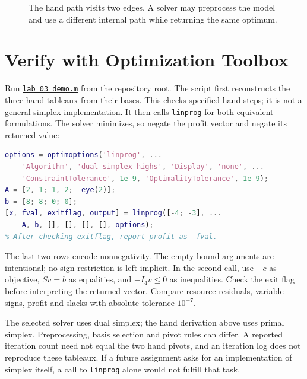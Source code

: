 \documentclass[11pt,a4paper]{article}
\begin{document}
\begin{figure}[H]
  \centering
  \caption{The hand path visits two edges. A solver may preprocess the model
    and use a different internal path while returning the same optimum.}
\end{figure}

\section{Verify with Optimization Toolbox}
Run \href{run:matlab/labs/lab_03_demo.m}{\texttt{lab\_03\_demo.m}} from the
repository root. The script first reconstructs the three hand tableaux from
their bases. This checks specified hand steps; it is not a general simplex
implementation. It then calls \texttt{linprog} for both equivalent formulations.
The solver minimizes, so negate the profit vector and negate its returned value:
\begin{lstlisting}[language=Matlab]
options = optimoptions('linprog', ...
    'Algorithm', 'dual-simplex-highs', 'Display', 'none', ...
    'ConstraintTolerance', 1e-9, 'OptimalityTolerance', 1e-9);
A = [2, 1; 1, 2; -eye(2)];
b = [8; 8; 0; 0];
[x, fval, exitflag, output] = linprog([-4; -3], ...
    A, b, [], [], [], [], options);
% After checking exitflag, report profit as -fval.
\end{lstlisting}
The last two rows encode nonnegativity. The empty bound arguments are
intentional; no sign restriction is left implicit. In the second call, use
$-c$ as objective, $S v=b$ as equalities, and $-I_4v\leq0$ as inequalities.
Check the exit flag before interpreting the returned vector. Compare resource
residuals, variable signs, profit and slacks with absolute tolerance $10^{-7}$.

The selected solver uses dual simplex; the hand derivation above uses primal
simplex. Preprocessing, basis selection and pivot rules can differ. A reported
iteration count need not equal the two hand pivots, and an iteration log does
not reproduce these tableaux. If a future assignment asks for an implementation
of simplex itself, a call to \texttt{linprog} alone would not fulfill that task.
\end{document}

